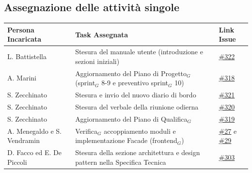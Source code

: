 \documentclass[a4paper, 10pt, colorlinks=true, linkcolor=black, urlcolor=blue, citecolor=blue, hidelinks]{article}
\newcommand{\issue}[1]{\href{https://github.com/thebitless-group-swe/thebitless.github.io/issues/#1}{\##1}}
\newcommand{\issueMVP}[1]{\href{https://github.com/thebitless-group-swe/MVP/issues/#1}{\##1}}
\begin{document}
\subsection{Assegnazione delle attività singole}
\begin{center}
    \renewcommand{\arraystretch}{1.4}
        \begin{tabular}{|p{4.2cm}|p{6.2cm}|p{2.2cm}|}
        \hline
        \textbf{Persona Incaricata} & \textbf{Task Assegnata} & \centering\textbf{Link Issue} \tabularnewline
        \hline
        L. Battistella & Stesura del manuale utente (introduzione e sezioni iniziali) & \issue{322} \\
        \hline
        A. Marini & Aggiornamento del Piano di Progetto$_G$ (sprint$_G$ 8-9 e preventivo sprint$_G$ 10) & \issue{318} \\
        \hline
        S. Zecchinato & Stesura e invio del nuovo diario di bordo & \issue{321} \\
        \hline
        S. Zecchinato & Stesura del verbale della riunione odierna & \issue{320} \\
        \hline
        S. Zecchinato & Aggiornamento del Piano di Qualifica$_G$ & \issue{319} \\
        \hline
        A. Menegaldo e S. Vendramin & Verifica$_G$ accoppiamento moduli e implementazione Facade (frontend$_G$) & \issueMVP{27} e \issueMVP{29} \\
        \hline
        D. Facco ed E. De Piccoli & Stesura della sezione architettura e design pattern nella Specifica Tecnica & \issue{303} \\
        \hline
    \end{tabular}
\end{center}

\appendix
\end{document}
